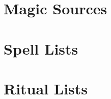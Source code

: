 \section{Magic Sources}\label{Magic Sources}

  

  \newpage
\section{Spell Lists}\label{Spell Lists}

  

  

\section{Ritual Lists}\label{Ritual Lists}

  

  
